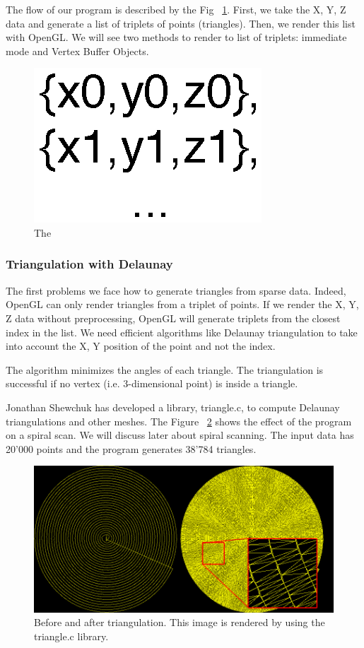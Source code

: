 The flow of our program is described by the Fig ~\ref{fig:timelinerendering}. First, we take the X, Y, Z data and generate a list of triplets of points (triangles). Then, we render this list with OpenGL. We will see two methods to render to list of triplets: immediate mode and Vertex Buffer Objects.

\begin{figure}[!ht]
  \centering
  \includegraphics[scale=0.40]{images/timelinerendering.eps}
    \caption{The }
  \label{fig:timelinerendering}
\end{figure}


\subsubsection{Triangulation with Delaunay}

The first problems we face how to generate triangles from sparse data. Indeed, OpenGL can only render triangles from a triplet of points. If we render the X, Y, Z data without preprocessing, OpenGL will generate triplets from the closest index in the list. We need efficient algorithms like Delaunay triangulation to take into account the X, Y position of the point and not the index.

The algorithm minimizes the angles of each triangle. The triangulation is successful if no vertex (i.e. 3-dimensional point) is inside a triangle.

Jonathan Shewchuk \cite{shewchuk96b} has developed a library, triangle.c, to compute Delaunay triangulations and other meshes. The Figure ~\ref{triangulation2d} shows the effect of the program on a spiral scan.  We will discuss later about spiral scanning. The input data has 20'000 points and the program generates 38'784 triangles. 
\begin{figure}[!ht]
  \centering
  \includegraphics[scale=0.45]{images/triangulation.png}
    \caption{Before and after triangulation. This image is rendered by using the triangle.c library.}
  \label{triangulation2d}
\end{figure}

